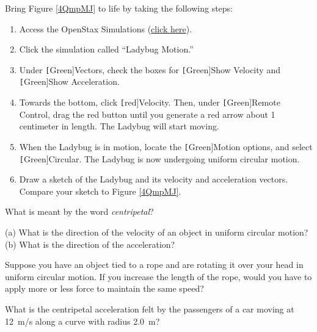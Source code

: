 \documentclass[main-physics.tex]{subfiles}
\begin{document}
\begin{exercise} \label{N066SF}
    Bring Figure \ref{4QmpMJ} to life by taking the following steps:

    \begin{enumerate}
        \item Access the OpenStax Simulations (\href{https://veillette.github.io/simulations/}{click here}).
        \item Click the simulation called ``Ladybug Motion.''
        \item Under \texttt[Green]{Vectors}, check the boxes for \texttt[Green]{Show Velocity} and \texttt[Green]{Show Acceleration}. 
        \item Towards the bottom, click \texttt[red]{Velocity}. Then, under \texttt[Green]{Remote Control}, drag the red button until you generate a red arrow about 1 centimeter in length. The Ladybug will start moving.
        \item When the Ladybug is in motion, locate the \texttt[Green]{Motion} options, and select \texttt[Green]{Circular}. The Ladybug is now undergoing uniform circular motion.
        \item Draw a sketch of the Ladybug and its velocity and acceleration vectors. Compare your sketch to Figure \ref{4QmpMJ}. 
    \end{enumerate}
\end{exercise}

\begin{exercise} \label{x2YCzr}
    What is meant by the word \textit{centripetal}?
\end{exercise}

\begin{exercise} \label{S4rGIt}
    (a) What is the direction of the velocity of an object in uniform circular motion? (b) What is the direction of the acceleration?
\end{exercise}

\begin{exercise} \label{aVu3ZA}
    Suppose you have an object tied to a rope and are rotating it over your head in uniform circular motion. If you increase the length of the rope, would you have to apply more or less force to maintain the same speed?
\end{exercise}

\begin{exercise} \label{kTvEZX}
    What is the centripetal acceleration felt by the passengers of a car moving at \SI{12}{m/s} along a curve with radius \SI{2.0}{m}?
\end{exercise}
\end{document}
